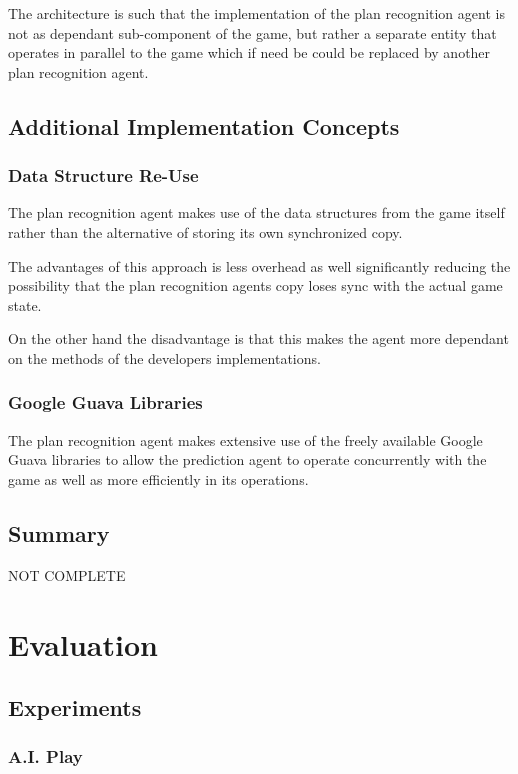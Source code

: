 \documentclass[parskip]{cs4rep}
\begin{document}
The architecture is such that the implementation of the plan recognition agent is not as dependant sub-component of the game, but rather a separate entity that operates in parallel to the game which if need be could be replaced by another plan recognition agent.

\section{Additional Implementation Concepts}

\subsection{Data Structure Re-Use}

The plan recognition agent makes use of the data structures from the game itself rather than the alternative of storing its own synchronized copy.

The advantages of this approach is less overhead as well significantly reducing the possibility that the plan recognition agents copy loses sync with the actual game state. 

On the other hand the disadvantage is that this makes the agent more dependant on the methods of the developers implementations.

\subsection{Google Guava Libraries}

The plan recognition agent makes extensive use of the freely available Google Guava libraries to allow the prediction agent to operate concurrently with the game as well as more efficiently in its operations.

\section{Summary}

NOT COMPLETE

\chapter{Evaluation} 

\section{Experiments}

\subsection{A.I. Play}
\end{document}
